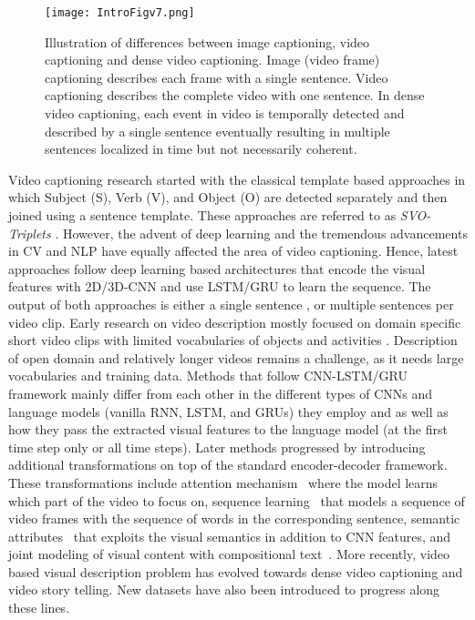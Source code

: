 \documentclass[10pt,journal,compsoc]{IEEEtran}
\begin{document}
\begin{figure*}[t] %
     \centering
     \texttt{[image: IntroFigv7.png]} 
     \vspace{-6mm}
     \caption{Illustration of differences between image captioning, video captioning and dense video captioning. Image (video frame) captioning describes each frame with a single sentence. Video captioning describes the complete video with one sentence. In dense video captioning, each event in video is temporally detected and described by a single sentence eventually resulting in multiple sentences localized in time but not necessarily coherent.}
\label{fig:piano}
\vspace{-5mm}
\end{figure*}

  
Video captioning research started with the classical template based approaches in which Subject (S), Verb (V), and Object (O) are detected separately and then joined using a sentence template. These approaches are referred to as \textit{SVO-Triplets} \cite{kojima2002natural,barbu2012video}. However, the advent of deep learning and the tremendous advancements in CV and NLP have equally affected the area of video captioning.
Hence, latest approaches follow deep learning based architectures \cite{venugopalan2015sequence,rohrbach2017movie} that encode the visual features with 2D/3D-CNN and use LSTM/GRU to learn the sequence.
The output of both approaches is either a single sentence \cite{xu2016msr,pan2016jointly}, or multiple sentences \cite{rohrbach2014coherent,barbu2012video, shin2016beyond, yu2016video, das2013thousand, khan2011human} per video clip. 
Early research on video description mostly focused on domain specific short video clips with limited vocabularies of objects and activities \cite{barbu2012video,das2013thousand,kojima2002natural,khan2012describing,rohrbach2013translating,yu2013grounded}. Description of open domain and relatively longer videos remains a challenge, as it needs large vocabularies and training data. 
  Methods that follow CNN-LSTM/GRU framework mainly differ from each other in the different types of CNNs and language models (vanilla RNN, LSTM, and GRUs) they employ and as well as how they pass the extracted visual features to the language model (at the first time step only or all time steps). Later methods progressed by introducing additional transformations on top of the standard encoder-decoder framework. These transformations include attention mechanism~\cite{yao2015describing} where the model learns which part of the video to focus on, sequence learning~\cite{venugopalan2015sequence} that models a sequence of video frames with the sequence of words in the corresponding sentence, semantic attributes~\cite{gan2017semantic, Pan_2017_CVPR} that exploits the visual semantics in addition to CNN features, and joint modeling of visual content with compositional text~\cite{pan2016jointly}. More recently, video based visual description problem has evolved towards dense video captioning and video story telling. New datasets have also been introduced to progress along these lines. 
  
\end{document}
